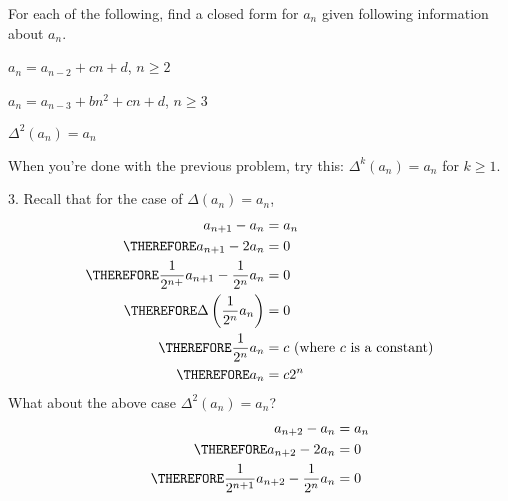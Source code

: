 \begin{ex}
  For each of the following,
  find a closed form for $a_n$ given following information about
  $a_n$.
  \begin{tightlist}

    \item 
    $a_n = a_{n-2} + cn + d$, $n \geq 2$

    \item 
    $a_n = a_{n-3} + bn^2 + cn + d$, $n \geq 3$

    \item
    $\Delta^2 (a_n) = a_n$

    \item When you're done with the previous problem, try this:
    $\Delta^k (a_n) = a_n$ for $k \geq 1$.
    
  \end{tightlist}
\end{ex}

\SOLUTION

3. Recall that for the case of $\Delta (a_n) = a_n$,
\begin{align*}
  a_{n+1} - a_n &= a_n \\
  \THEREFORE a_{n+1} - 2 a_n &= 0 \\
  \THEREFORE \frac{1}{2^{n+}} a_{n+1} - \frac{1}{2^n} a_n &= 0 \\
  \THEREFORE \Delta \left( \frac{1}{2^n} a_n \right) &= 0\\
  \THEREFORE \frac{1}{2^n} a_n &= c \text{ (where $c$ is a constant)} \\
  \THEREFORE a_n &= c 2^n
\end{align*}
What about the above case $\Delta^2 ( a_n ) = a_n$?
\begin{align*}
  a_{n+2} - a_n &= a_n \\
  \THEREFORE a_{n+2} - 2 a_n &= 0 \\
  \THEREFORE \frac{1}{2^{n+1}} a_{n+2} - \frac{1}{2^n} a_n &= 0 \\
\end{align*}

